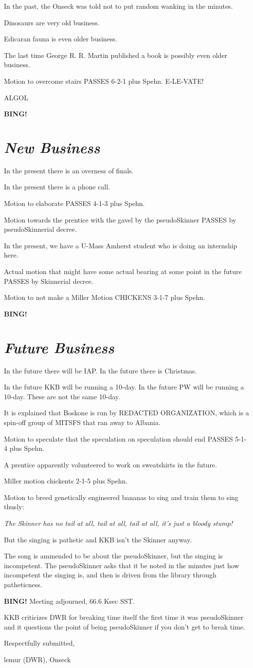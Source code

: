 \documentclass[10pt]{article}
\newcommand{\bing}{{\bf BING!} }
\newcommand{\goto}[1]{\bing \vskip 12pt \section*{{\em{#1}}}}
\newcommand{\ps}{ plus Spehn\xspace}
\newcommand{\onseck}{lemur (DWR), Onseck}
\begin{document}
In the past, the Onseck was told not to put random wanking in the minutes.

Dinosaurs are very old business.

Edicaran fauna is even older business.

The last time George R. R. Martin published a book is possibly even older
business.

Motion to overcome stairs PASSES 6-2-1\ps.  E-LE-VATE!

ALGOL

\goto{New Business}

In the present there is an overness of finals.

In the present there is a phone call.

Motion to elaborate PASSES 4-1-3\ps.

Motion towards the prentice with the gavel by the pseudoSkinner PASSES by
pseudoSkinnerial decree.

In the present, we have a U-Mass Amherst student who is doing an internship
here.

Actual motion that might have some actual bearing at some point in the
future PASSES by Skinnerial decree.

Motion to not make a Miller Motion CHICKENS 3-1-7\ps.

\goto{Future Business}

In the future there will be IAP.  In the future there is Christmas.

In the future KKB will be running a 10-day.  In the future PW will
be running a 10-day.  These are not the same 10-day.

It is explained that Boskone is run by REDACTED ORGANIZATION,
which is a spin-off group of MITSFS that ran away to Albania.

Motion to speculate that the speculation on speculation should end
PASSES 5-1-4\ps.

A prentice apparently volunteered to work on sweatshirts in the future.

Miller motion chickents 2-1-5\ps.

Motion to breed genetically engineered bananas to sing and train them to sing
thusly:

\emph{The Skinner has no tail at all, tail at all, tail at all, it's just
a bloody stump!}

But the singing is pathetic and KKB isn't the Skinner anyway.

The song is ammended to be about the pseudoSkinner, but the singing is
incompetent.  The pseudoSkinner asks that it be noted in the minutes just
how incompetent the singing is, and then is driven from the library
through patheticness.

\bing
\noindent
Meeting adjourned, 66.6 Ksec SST.

KKB criticizes DWR for breaking time itself the first time it was
pseudoSkinner and it questions the point of being pseudoSkinner
if you don't get to break time.

\vspace{18pt}

\centerline{Respectfully submitted,}
\centerline{\onseck}
\end{document}
